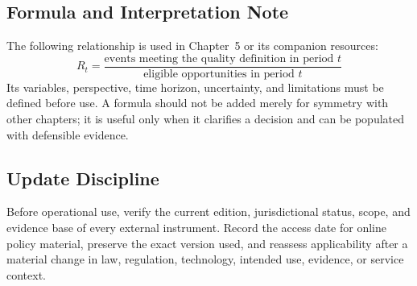 \subsection{Formula and Interpretation Note}
The following relationship is used in Chapter~5 or its companion resources:
\begin{equation}
R_t=\frac{\text{events meeting the quality definition in period }t}{\text{eligible opportunities in period }t}
\label{eq:comp-ch05-reference-formula}
\end{equation}
Its variables, perspective, time horizon, uncertainty, and limitations must be
defined before use. A formula should not be added merely for symmetry with other
chapters; it is useful only when it clarifies a decision and can be populated with
defensible evidence.

\subsection{Update Discipline}
Before operational use, verify the current edition, jurisdictional status, scope,
and evidence base of every external instrument. Record the access date for online
policy material, preserve the exact version used, and reassess applicability after a
material change in law, regulation, technology, intended use, evidence, or service
context.
